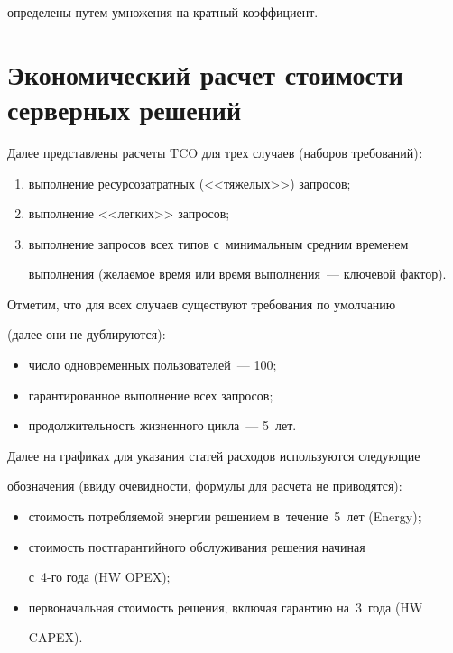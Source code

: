 определены путем умножения на кратный коэффициент.



\section{Экономический расчет стоимости серверных решений}

     

  Далее представлены расчеты TCO для трех случаев (наборов требований):

  \begin{enumerate}[(1)]

  \item

выполнение ресурсозатратных (<<тяжелых>>) запросов;

\item выполнение <<легких>> запросов;

\item выполнение запросов всех типов с~минимальным средним временем 

выполнения (желаемое время или время выполнения~--- ключевой фактор).

\end{enumerate}



    Отметим, что для всех случаев существуют требования по умолчанию 

(далее они не дублируются):

    \begin{itemize}

\item число одновременных пользователей~--- 100;\\[-13pt]

\item гарантированное выполнение всех запросов;\\[-13pt]

\item продолжительность жизненного цикла~--- 5~лет. 

\end{itemize}

  

  Далее на графиках для указания статей расходов используются следующие 

обозначения (ввиду очевидности, формулы для расчета не приводятся):

  \begin{itemize}

\item стоимость потребляемой энергии решением в~течение~5~лет (Energy);\\[-13pt]

\item стоимость постгарантийного обслуживания решения начиная 

с~4-го года (HW OPEX);\\[-13pt]

\item первоначальная стоимость решения, включая гарантию на~3~года (HW 

CAPEX).

\end{itemize}

